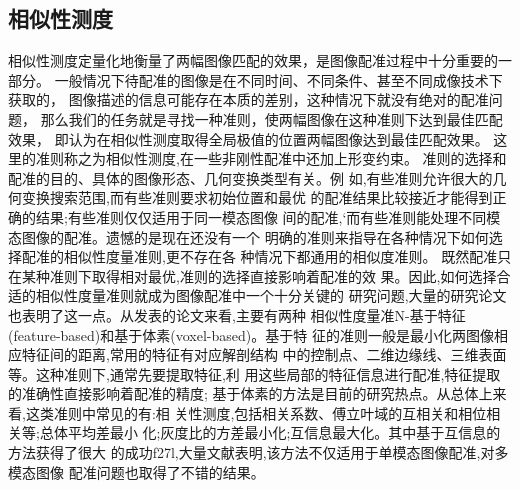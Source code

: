 \subsection{相似性测度}\label{SectionMetric}
相似性测度定量化地衡量了两幅图像匹配的效果，是图像配准过程中十分重要的一部分。
一般情况下待配准的图像是在不同时间、不同条件、甚至不同成像技术下获取的，
图像描述的信息可能存在本质的差别，这种情况下就没有绝对的配准问题，
那么我们的任务就是寻找一种准则，使两幅图像在这种准则下达到最佳匹配效果，
即认为在相似性测度取得全局极值的位置两幅图像达到最佳匹配效果。
这里的准则称之为相似性测度,在一些非刚性配准中还加上形变约束。
准则的选择和配准的目的、具体的图像形态、几何变换类型有关。例
如,有些准则允许很大的几何变换搜索范围,而有些准则要求初始位置和最优
的配准结果比较接近才能得到正确的结果;有些准则仅仅适用于同一模态图像
间的配准,‘而有些准则能处理不同模态图像的配准。遗憾的是现在还没有一个
明确的准则来指导在各种情况下如何选择配准的相似性度量准则,更不存在各
种情况下都通用的相似度准则。
既然配准只在某种准则下取得相对最优,准则的选择直接影响着配准的效
果。因此,如何选择合适的相似性度量准则就成为图像配准中一个十分关键的
研究问题,大量的研究论文也表明了这一点。从发表的论文来看,主要有两种
相似性度量准N-基于特征(feature-based)和基于体素(voxel-based)。基于特
征的准则一般是最小化两图像相应特征间的距离,常用的特征有对应解剖结构
中的控制点、二维边缘线、三维表面等。这种准则下,通常先要提取特征,利
用这些局部的特征信息进行配准,特征提取的准确性直接影响着配准的精度;
基于体素的方法是目前的研究热点。从总体上来看,这类准则中常见的有:相
关性测度,包括相关系数、傅立叶域的互相关和相位相关等;总体平均差最小
化;灰度比的方差最小化;互信息最大化。其中基于互信息的方法获得了很大
的成功f27l,大量文献表明,该方法不仅适用于单模态图像配准,对多模态图像
配准问题也取得了不错的结果。
